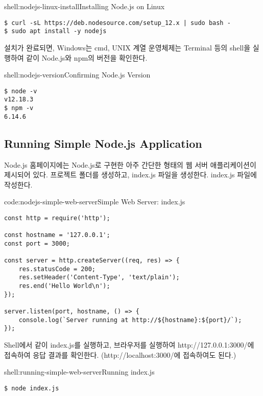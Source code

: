\begin{shellenv}{shell:nodejs-linux-install}{Installing Node.js on Linux}\begin{verbatim}
$ curl -sL https://deb.nodesource.com/setup_12.x | sudo bash -
$ sudo apt install -y nodejs
\end{verbatim}
\end{shellenv}

설치가 완료되면, Windows는 cmd, UNIX 계열 운영체제는 Terminal 등의 shell을 실행하여 \과 같이 Node.js와 npm의 버전을 확인한다.

\begin{shellenv}{shell:nodejs-version}{Confirming Node.js Version}\begin{verbatim}
$ node -v
v12.18.3
$ npm -v
6.14.6
\end{verbatim}
\end{shellenv}

\subsection*{Running Simple Node.js Application}
Node.js 홈페이지에는 Node.js로 구현한 아주 간단한 형태의 웹 서버 애플리케이션이 제시되어 있다. 프로젝트 폴더를 생성하고, index.js 파일을 생성한다. index.js 파일에 \를 작성한다.

\begin{codeenv}{code:nodejs-simple-web-server}{Simple Web Server: index.js}\begin{verbatim}
const http = require('http');

const hostname = '127.0.0.1';
const port = 3000;

const server = http.createServer((req, res) => {
    res.statusCode = 200;
    res.setHeader('Content-Type', 'text/plain');
    res.end('Hello World\n');
});

server.listen(port, hostname, () => {
    console.log(`Server running at http://${hostname}:${port}/`);
});
\end{verbatim}
\end{codeenv}

Shell에서 \와 같이 index.js를 실행하고, 브라우저를 실행하여 http://127.0.0.1:3000/에 접속하여 응답 결과를 확인한다. (http://localhost:3000/에 접속하여도 된다.)

\begin{shellenv}{shell:running-simple-web-server}{Running index.js}\begin{verbatim}
$ node index.js
\end{verbatim}
\end{shellenv}
